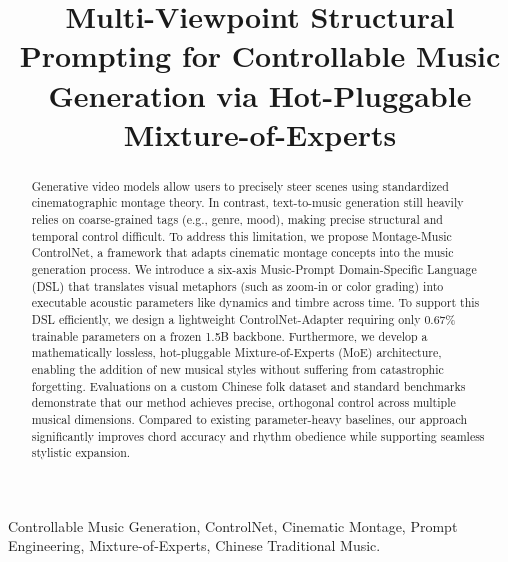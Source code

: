 \documentclass[conference]{IEEEtran}
\begin{document}
\title{Multi-Viewpoint Structural Prompting for Controllable Music Generation via Hot-Pluggable Mixture-of-Experts}

\author{
}

\maketitle

\begin{abstract}
Generative video models allow users to precisely steer scenes using standardized cinematographic montage theory. In contrast, text-to-music generation still heavily relies on coarse-grained tags (e.g., genre, mood), making precise structural and temporal control difficult. To address this limitation, we propose Montage-Music ControlNet, a framework that adapts cinematic montage concepts into the music generation process. We introduce a six-axis Music-Prompt Domain-Specific Language (DSL) that translates visual metaphors (such as zoom-in or color grading) into executable acoustic parameters like dynamics and timbre across time. To support this DSL efficiently, we design a lightweight ControlNet-Adapter requiring only 0.67\% trainable parameters on a frozen 1.5B backbone. Furthermore, we develop a mathematically lossless, hot-pluggable Mixture-of-Experts (MoE) architecture, enabling the addition of new musical styles without suffering from catastrophic forgetting. Evaluations on a custom Chinese folk dataset and standard benchmarks demonstrate that our method achieves precise, orthogonal control across multiple musical dimensions. Compared to existing parameter-heavy baselines, our approach significantly improves chord accuracy and rhythm obedience while supporting seamless stylistic expansion.
\end{abstract}

\begin{IEEEkeywords}
Controllable Music Generation, ControlNet, Cinematic Montage, Prompt Engineering, Mixture-of-Experts, Chinese Traditional Music.
\end{IEEEkeywords}
\end{document}
